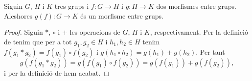 \documentclass[../Apunts.tex]{subfiles}
\begin{document}
	\begin{proposition}\label{prop:conjugació de morfismes entre grups és morfisme entre grups}
		Siguin \(G\), \(H\) i \(K\) tres grups i \(f\colon G\longrightarrow H\) i \(g\colon H\longrightarrow K\) dos morfismes entre grups. Aleshores \(g(f)\colon G\longrightarrow K\) és un morfisme entre grups.
		\begin{proof}
			Siguin \(\ast\), \(\circ\) i \(+\) les operacions de \(G\), \(H\) i \(K\), respectivament. Per la definició de  tenim que per a tot \(g_{1},g_{2}\in H\) i \(h_{1},h_{2}\in H\) tenim \(f(g_{1}\ast g_{2})=f(g_{1})\circ f(g_{2})\) i \(g(h_{1}\circ h_{2})=g(h_{1})+g(h_{2})\). Per tant
			\[g(f(g_{1}\ast g_{2}))=g(f(g_{1})\circ f(g_{2}))=g(f(g_{1}))+g(f(g_{2})),\]
			i per la definició de  hem acabat.
		\end{proof}
	\end{proposition}
\end{document}
